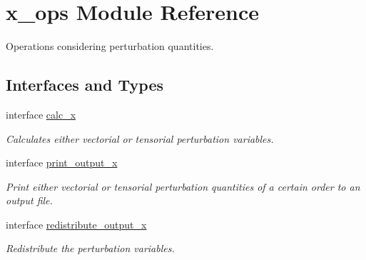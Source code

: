 \hypertarget{namespacex__ops}{}\section{x\+\_\+ops Module Reference}
\label{namespacex__ops}


Operations considering perturbation quantities.  


\subsection*{Interfaces and Types}
\begin{DoxyCompactItemize}
\item 
interface \hyperlink{interfacex__ops_1_1calc__x}{calc\+\_\+x}
\begin{DoxyCompactList}\small\item\em Calculates either vectorial or tensorial perturbation variables. \end{DoxyCompactList}\item 
interface \hyperlink{interfacex__ops_1_1print__output__x}{print\+\_\+output\+\_\+x}
\begin{DoxyCompactList}\small\item\em Print either vectorial or tensorial perturbation quantities of a certain order to an output file. \end{DoxyCompactList}\item 
interface \hyperlink{interfacex__ops_1_1redistribute__output__x}{redistribute\+\_\+output\+\_\+x}
\begin{DoxyCompactList}\small\item\em Redistribute the perturbation variables. \end{DoxyCompactList}\end{DoxyCompactItemize}
